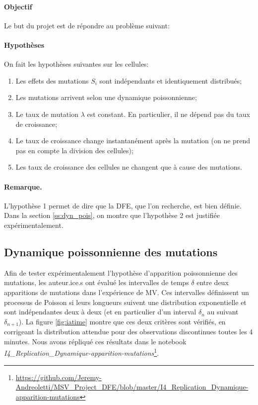 \documentclass[12pt]{article}
\newcommand{\req}[1]{\paragraph{Remarque.}#1\vspace{0.1cm}}
\begin{document}
\paragraph{Objectif} Le but du projet est de répondre au problème suivant:
\vspace{5mm}



\paragraph{Hypothèses}
On fait les hypothèses suivantes sur les cellules:
\begin{enumerate}
\item Les effets des mutations $S_i$ sont indépendants et identiquement distribués;
\item Les mutations arrivent selon une dynamique poissonnienne;
\item Le taux de mutation $\lambda$ est constant. En particulier, il ne dépend pas du taux de croissance;
\item Le taux de croissance change instantanément après la mutation (on ne prend pas en compte la division des cellules);
\item Les taux de croissance des cellules ne changent que à cause des mutations.
\end{enumerate}

\req{L'hypothèse 1 permet de dire que la DFE, que l'on recherche, est bien définie. Dans la section \ref{ss:dyn_pois}, on montre que l'hypothèse 2 est justifiée expérimentalement.}

\subsection{Dynamique poissonnienne des mutations\label{ss:dyn_pois}}

Afin de tester expérimentalement l'hypothèse d'apparition poissonnienne des mutations, les auteur.ice.s ont évalué les intervalles de temps $\delta$ entre deux apparitions de mutations dans l'expérience de MV. Ces intervalles définissent un processus de Poisson si leurs longueurs suivent une distribution exponentielle et sont indépendantes deux à deux (et en particulier d'un interval $\delta_n$ au suivant $\delta_{n+1}$). La figure \ref{fig:iatime} montre que ces deux critères sont vérifiés, en corrigeant la distribution attendue pour des observations discontinues toutes les 4 minutes. Nous avons répliqué ces résultats dans le notebook \emph{I4\_Replication\_Dynamique-apparition-mutations}\footnote{\url{https://github.com/Jeremy-Andreoletti/MSV_Project_DFE/blob/master/I4_Replication_Dynamique-apparition-mutations}}.
\end{document}
